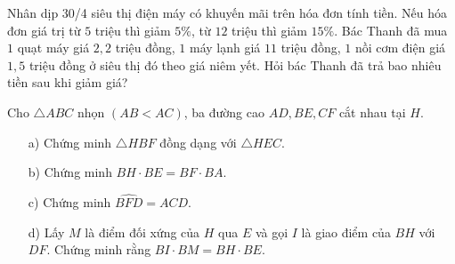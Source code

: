 \begin{ex}
	Nhân dịp 30/4 siêu thị điện máy có khuyến mãi trên hóa đơn tính tiền. Nếu hóa đơn giá trị từ $5$ triệu thì giảm $5\%$, từ $12$ triệu thì giảm $15\%$. Bác Thanh đã mua $1$ quạt máy giá $2,2$ triệu đồng, $1$ máy lạnh giá $11$ triệu đồng, $1$ nồi cơm điện giá $1,5$ triệu đồng ở siêu thị đó theo giá niêm yết. Hỏi bác Thanh đã trả bao nhiêu tiền sau khi giảm giá?
\end{ex}
\begin{ex}%
	Cho $\triangle ABC$ nhọn $(AB<AC)$, ba đường cao $AD,BE,CF$ cắt nhau tại $H$. 
	\begin{enumerate}
		\item[a)] Chứng minh $\triangle HBF$ đồng dạng với $\triangle HEC$.
		\item[b)] Chứng minh $BH \cdot BE = BF \cdot BA$.
		\item[c)] Chứng minh $\widehat{BFD} =\widehat{ACD}$.
		\item[d)] Lấy $M$ là điểm đối xứng của $H$ qua $E$ và gọi $I$ là giao điểm của $BH$ với $DF$. Chứng minh rằng $BI\cdot BM = BH \cdot BE$.
	\end{enumerate}
\end{ex}
